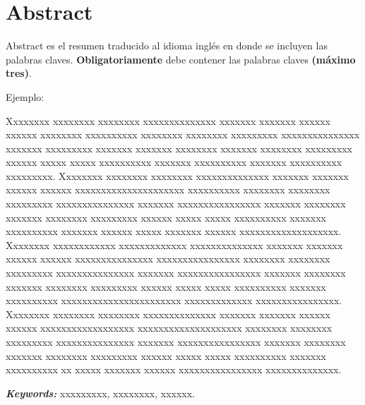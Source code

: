 \chapter*{Abstract}

Abstract es el resumen traducido al idioma inglés en donde se incluyen las palabras claves. \textbf{Obligatoriamente} debe contener las palabras claves \textbf{(máximo tres)}.

\vspace{0.5cm}

Ejemplo:

\vspace{0.5cm}

Xxxxxxxx xxxxxxxx xxxxxxxx xxxxxxxxxxxxxx xxxxxxx xxxxxxx xxxxxx xxxxxx xxxxxxxx xxxxxxxxxx xxxxxxxx xxxxxxxx xxxxxxxxx xxxxxxxxxxxxxxx xxxxxxx xxxxxxxxx xxxxxxx xxxxxxx xxxxxxxx xxxxxxx xxxxxxxx xxxxxxxxx xxxxxx xxxxx xxxxx xxxxxxxxxx xxxxxxx xxxxxxxxxx xxxxxxx xxxxxxxxxx xxxxxxxxx. Xxxxxxxx xxxxxxxx xxxxxxxx xxxxxxxxxxxxxx xxxxxxx xxxxxxx xxxxxx xxxxxx xxxxxxxxxxxxxxxxxxxxx xxxxxxxxxx xxxxxxxx xxxxxxxx xxxxxxxxx xxxxxxxxxxxxxxx xxxxxxx xxxxxxxxxxxxxxxx xxxxxxx xxxxxxxx xxxxxxx xxxxxxxx xxxxxxxxx xxxxxx xxxxx xxxxx xxxxxxxxxx xxxxxxx xxxxxxxxxx xxxxxxx xxxxxx xxxxx xxxxxxx xxxxxx xxxxxxxxxxxxxxxxxxx. Xxxxxxxx xxxxxxxxxxxx xxxxxxxxxxxxx xxxxxxxxxxxxxx xxxxxxx xxxxxxx xxxxxx xxxxxx xxxxxxxxxxxxxxx xxxxxxxxxxxxxxxx xxxxxxxx xxxxxxxx xxxxxxxxx xxxxxxxxxxxxxxx xxxxxxx xxxxxxxxxxxxxxxx xxxxxxx xxxxxxxx xxxxxxx xxxxxxxx xxxxxxxxx xxxxxx xxxxx xxxxx xxxxxxxxxx xxxxxxx xxxxxxxxxx xxxxxxxxxxxxxxxxxxxxxxx xxxxxxxxxxxxx xxxxxxxxxxxxxxxx. Xxxxxxxx xxxxxxxx xxxxxxxx xxxxxxxxxxxxxx xxxxxxx xxxxxxx xxxxxx xxxxxx xxxxxxxxxxxxxxxxxx xxxxxxxxxxxxxxxxxxxx xxxxxxxx xxxxxxxx xxxxxxxxx xxxxxxxxxxxxxxx xxxxxxx xxxxxxxxxxxxxxxx xxxxxxx xxxxxxxx xxxxxxx xxxxxxxx xxxxxxxxx xxxxxx xxxxx xxxxx xxxxxxxxxx xxxxxxx xxxxxxxxxx xx xxxxx xxxxxxx xxxxxx xxxxxxxxxxxxxxxx xxxxxxxxxxxxxx.

\vspace{0.5cm}

\textbf{\textit{Keywords:}} xxxxxxxxx, xxxxxxxx, xxxxxx.